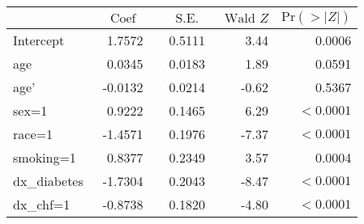 \documentclass{article}\usepackage[]{graphicx}\usepackage[]{color}
\begin{document}
\vspace{1ex}

\setlongtables\begin{longtable}{lrrrr}\hline
\multicolumn{1}{l}{}&\multicolumn{1}{c}{$\textrm{~Coef~}$}&\multicolumn{1}{c}{$\textrm{~S.E.~}$}&\multicolumn{1}{c}{$\textrm{Wald~} Z$}&\multicolumn{1}{c}{$\textrm{Pr}(>|Z|)$}\tabularnewline
\hline
\endhead
\hline
\endfoot
Intercept&~ 1.7572~&~0.5111~& 3.44&0.0006\tabularnewline
age&~ 0.0345~&~0.0183~& 1.89&0.0591\tabularnewline
age'&~-0.0132~&~0.0214~&-0.62&0.5367\tabularnewline
sex=1&~ 0.9222~&~0.1465~& 6.29&$<0.0001$\tabularnewline
race=1&~-1.4571~&~0.1976~&-7.37&$<0.0001$\tabularnewline
smoking=1&~ 0.8377~&~0.2349~& 3.57&0.0004\tabularnewline
dx\_diabetes&~-1.7304~&~0.2043~&-8.47&$<0.0001$\tabularnewline
dx\_chf=1&~-0.8738~&~0.1820~&-4.80&$<0.0001$\tabularnewline
\hline
\end{longtable}
\addtocounter{table}{-1}
\end{document}
